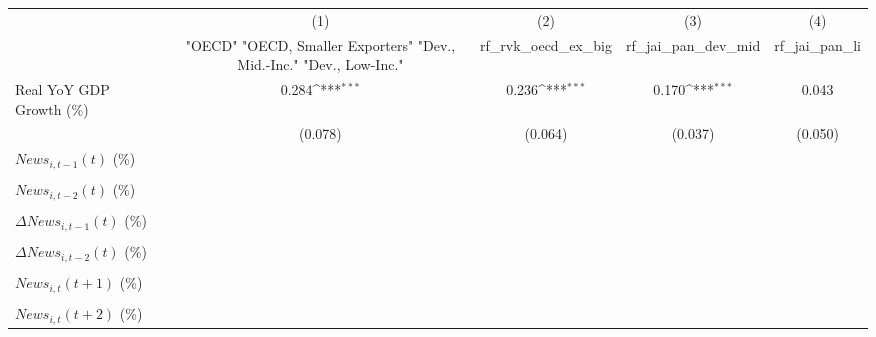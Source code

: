 {
\def\sym#1{\ifmmode^{#1}\else\(^{#1}\)\fi}
\begin{tabular}{l*{4}{c}}
\toprule
                    &\multicolumn{1}{c}{(1)}&\multicolumn{1}{c}{(2)}&\multicolumn{1}{c}{(3)}&\multicolumn{1}{c}{(4)}\\
                    &\multicolumn{1}{c}{ "OECD" "OECD, Smaller Exporters" "Dev., Mid.-Inc." "Dev., Low-Inc."}&\multicolumn{1}{c}{rf_rvk_oecd_ex_big}&\multicolumn{1}{c}{rf_jai_pan_dev_mid}&\multicolumn{1}{c}{rf_jai_pan_li}\\
\midrule
Real YoY GDP Growth (\%)&       0.284\sym{***}&       0.236\sym{***}&       0.170\sym{***}&       0.043         \\
                    &     (0.078)         &     (0.064)         &     (0.037)         &     (0.050)         \\
\addlinespace
$ News_{i,t-1}(t)$ (\%)&                     &                     &                     &                     \\
                    &                     &                     &                     &                     \\
\addlinespace
$ News_{i,t-2}(t)$ (\%)&                     &                     &                     &                     \\
                    &                     &                     &                     &                     \\
\addlinespace
$ \Delta News_{i,t-1}(t)$ (\%)&                     &                     &                     &                     \\
                    &                     &                     &                     &                     \\
\addlinespace
$ \Delta News_{i,t-2}(t)$ (\%)&                     &                     &                     &                     \\
                    &                     &                     &                     &                     \\
\addlinespace
$ News_{i,t}(t+1)$ (\%)&                     &                     &                     &                     \\
                    &                     &                     &                     &                     \\
\addlinespace
$ News_{i,t}(t+2)$ (\%)&                     &                     &                     &                     \\

\end{tabular}}

